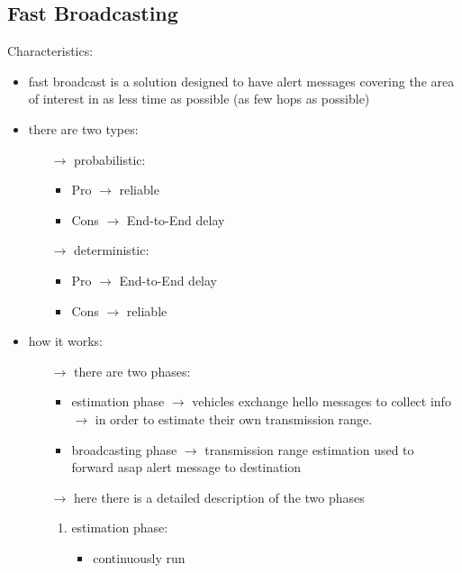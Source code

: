 \subsection{Fast Broadcasting}
Characteristics:
\begin{itemize}
    \item fast broadcast is a solution designed to have alert messages covering
    the area of interest in as less time as possible (as few hops as possible)
    \item there are two types:
    \begin{itemize}
        \item[$\rightarrow$] probabilistic:
        \begin{itemize}
            \item Pro $\rightarrow$ reliable
            \item Cons $\rightarrow$ End-to-End delay
        \end{itemize}
        \item[$\rightarrow$] deterministic:
        \begin{itemize}
            \item Pro $\rightarrow$ End-to-End delay
            \item Cons $\rightarrow$ reliable
        \end{itemize} 
    \end{itemize}
    \item how it works:
    \begin{itemize}
        \item[$\rightarrow$] there are two phases:
        \begin{itemize}
            \item estimation phase $\rightarrow$ vehicles exchange hello
            messages to collect info $\rightarrow$ in order to estimate
            their own transmission range.
            \item broadcasting phase $\rightarrow$ transmission range estimation used
            to\\forward asap alert message to destination
        \end{itemize}
        \item[$\rightarrow$] here there is a detailed description of the two phases
        \begin{enumerate}
            \item estimation phase:
            \begin{itemize}
                \item continuously run

\end{itemize}
\end{enumerate}
\end{itemize}
\end{itemize}
